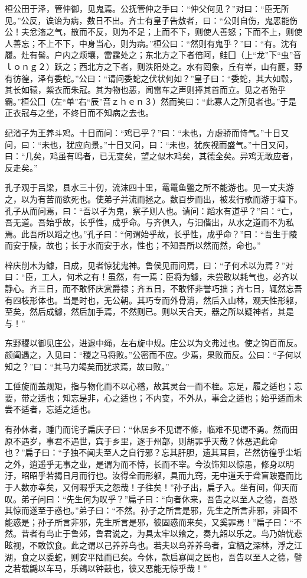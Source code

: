 \documentclass[]{article}
\begin{document}
桓公田于泽，管仲御，见鬼焉。公抚管仲之手曰：``仲父何见？''对曰：``臣无所见。''公反，诶诒为病，数日不出。齐士有皇子告敖者，曰：``公则自伤，鬼恶能伤公！夫忿滀之气，散而不反，则为不足；上而不下，则使人善怒；下而不上，则使人善忘；不上不下，中身当心，则为病。''桓公曰：``然则有鬼乎？''曰：``有。沈有履。灶有髻。户内之烦壤，雷霆处之；东北方之下者倍阿，鲑囗（上``龙''下``虫''音ｌｏｎｇ２）跃之；西北方之下者，则泆阳处之。水有罔象，丘有峷，山有夔，野有彷徨，泽有委蛇。''公曰：``请问委蛇之伏状何如？''皇子曰：``委蛇，其大如毂，其长如辕，紫衣而朱冠。其为物也恶，闻雷车之声则捧其首而立。见之者殆乎霸。''桓公囗（左``单''右``辰''音ｚｈｅｎ３）然而笑曰：``此寡人之所见者也。''于是正衣冠与之坐，不终日而不知病之去也。

纪渻子为王养斗鸡。十日而问：``鸡已乎？''曰：``未也，方虚骄而恃气。''十日又问，曰：``未也，犹应向景。''十日又问，曰：``未也，犹疾视而盛气。''十日又问，曰：``几矣，鸡虽有鸣者，已无变矣，望之似木鸡矣，其德全矣。异鸡无敢应者，反走矣。''

孔子观于吕梁，县水三十仞，流沫四十里，鼋鼍鱼鳖之所不能游也。见一丈夫游之，以为有苦而欲死也。使弟子并流而拯之。数百步而出，被发行歌而游于塘下。孔子从而问焉，曰：``吾以子为鬼，察子则人也。请问：蹈水有道乎？''曰：``亡，吾无道。吾始乎故，长乎性，成乎命。与齐俱入，与汩偕出，从水之道而不为私焉。此吾所以蹈之也。''孔子曰：``何谓始乎故，长乎性，成乎命？''曰：``吾生于陵而安于陵，故也；长于水而安于水，性也；不知吾所以然而然，命也。''

梓庆削木为鐻，日成，见者惊犹鬼神。鲁侯见而问焉，曰：``子何术以为焉？''对曰：``臣，工人，何术之有！虽然，有一焉：臣将为鐻，未尝敢以耗气也，必齐以静心。齐三日，而不敢怀庆赏爵禄；齐五日，不敢怀非誉巧拙；齐七日，辄然忘吾有四枝形体也。当是时也，无公朝。其巧专而外骨消，然后入山林，观天性形躯，至矣，然后成鐻，然后加手焉，不然则已。则以天合天，器之所以疑神者，其是与！''

东野稷以御见庄公，进退中绳，左右旋中规。庄公以为文弗过也。使之钩百而反。颜阖遇之，入见曰：``稷之马将败。''公密而不应。少焉，果败而反。公曰：``子何以知之？''曰：``其马力竭矣而犹求焉，故曰败。''

工倕旋而盖规矩，指与物化而不以心稽，故其灵台一而不桎。忘足，履之适也；忘要，带之适也；知忘是非，心之适也；不内变，不外从，事会之适也；始乎适而未尝不适者，忘适之适也。

有孙休者，踵门而诧子扁庆子曰：``休居乡不见谓不修，临难不见谓不勇。然而田原不遇岁，事君不遇世，宾于乡里，逐于州部，则胡罪乎天哉？休恶遇此命也？''扁子曰：``子独不闻夫至人之自行邪？忘其肝胆，遗其耳目，芒然彷徨乎尘垢之外，逍遥乎无事之业，是谓为而不恃，长而不宰。今汝饰知以惊愚，修身以明汙，昭昭乎若揭日月而行也。汝得全而形躯，具而九窍，无中道夭于聋盲跛蹇而比于人数亦幸矣，又何暇乎天之怨哉！子往矣！''孙子出，扁子入。坐有间，仰天而叹。弟子问曰：``先生何为叹乎？''扁子曰∶``向者休来，吾告之以至人之德，吾恐其惊而遂至于惑也。''弟子曰：``不然。孙子之所言是邪，先生之所言非邪，非固不能惑是；孙子所言非邪，先生所言是邪，彼固惑而来矣，又奚罪焉！''扁子曰：``不然。昔者有鸟止于鲁郊，鲁君说之，为具太牢以飨之，奏九韶以乐之。鸟乃始忧悲眩视，不敢饮食。此之谓以己养养鸟也。若夫以鸟养养鸟者，宜栖之深林，浮之江湖，食之以委蛇，则安平陆而已矣。今休，款启寡闻之民也，吾告以至人之德，譬之若载鼷以车马，乐鴳以钟鼓也，彼又恶能无惊乎哉！''
\end{document}
